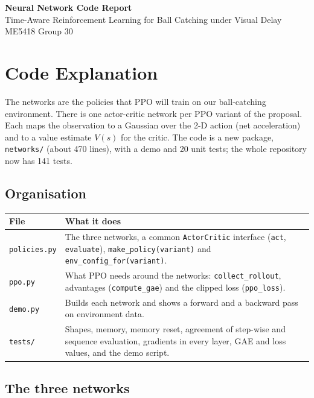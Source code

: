 \documentclass[10pt,a4paper]{article}
\newcommand{\code}[1]{\texttt{#1}}
\begin{document}
\begin{center}
  {\Large\bfseries Neural Network Code Report}\\[3pt]
  Time-Aware Reinforcement Learning for Ball Catching under Visual Delay\\[2pt]
  ME5418 Group 30
\end{center}

\section{Code Explanation}

The networks are the policies that PPO will train on our ball-catching environment. There is one
actor-critic network per PPO variant of the proposal. Each maps the observation to a Gaussian over
the 2-D action (net acceleration) and to a value estimate $V(s)$ for the critic. The code is a new
package, \code{networks/} (about 470 lines), with a demo and 20 unit tests; the whole repository now
has 141 tests.

\subsection{Organisation}

\begin{tabularx}{\textwidth}{@{}lX@{}}
  \toprule
  File & What it does \\
  \midrule
  \code{policies.py} & The three networks, a common \code{ActorCritic} interface (\code{act}, \code{evaluate}),
                       \code{make\_policy(variant)} and \code{env\_config\_for(variant)}. \\
  \code{ppo.py}      & What PPO needs around the networks: \code{collect\_rollout}, advantages
                       (\code{compute\_gae}) and the clipped loss (\code{ppo\_loss}). \\
  \code{demo.py}     & Builds each network and shows a forward and a backward pass on environment data. \\
  \code{tests/}      & Shapes, memory, memory reset, agreement of step-wise and sequence evaluation,
                       gradients in every layer, GAE and loss values, and the demo script. \\
  \bottomrule
\end{tabularx}

\subsection{The three networks}
\end{document}
